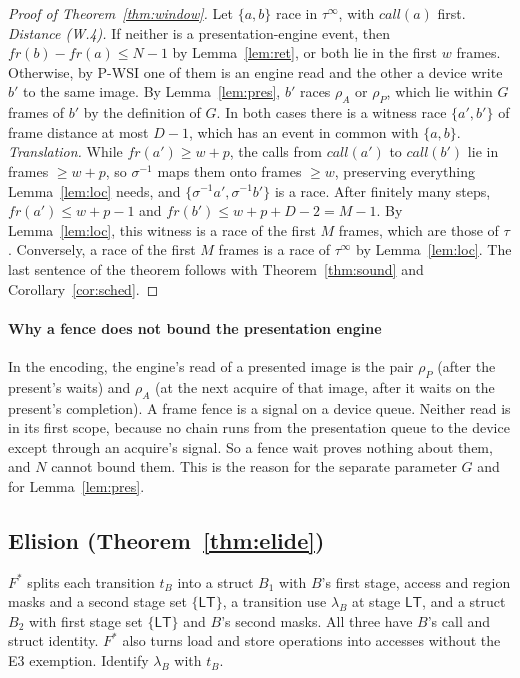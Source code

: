 \begin{proof}[Proof of Theorem~\ref{thm:window}]
Let $\{a,b\}$ race in $\tau^\infty$, with $\mathit{call}(a)$ first. \emph{Distance (W.4).} If neither is a
presentation-engine event, then $\mathit{fr}(b) - \mathit{fr}(a) \le N - 1$ by Lemma~\ref{lem:ret}, or both lie in
the first $w$ frames. Otherwise, by P-WSI one of them is an engine read and the other a device write $b'$ to the same
image. By Lemma~\ref{lem:pres}, $b'$ races $\rho_A$ or $\rho_P$, which lie within $G$ frames of $b'$ by the definition
of $G$. In both cases there is a witness race $\{a',b'\}$ of frame distance at most $D - 1$, which has an event in
common with $\{a,b\}$. \emph{Translation.} While $\mathit{fr}(a') \ge w + p$, the calls from $\mathit{call}(a')$ to
$\mathit{call}(b')$ lie in frames $\ge w + p$, so $\sigma^{-1}$ maps them onto frames $\ge w$, preserving everything
Lemma~\ref{lem:loc} needs, and $\{\sigma^{-1}a', \sigma^{-1}b'\}$ is a race. After finitely many steps, $\mathit{fr}(a')
\le w + p - 1$ and $\mathit{fr}(b') \le w + p + D - 2 = M - 1$. By Lemma~\ref{lem:loc}, this witness is a race of the
first $M$ frames, which are those of $\tau$. Conversely, a race of the first $M$ frames is a race of $\tau^\infty$ by
Lemma~\ref{lem:loc}. The last sentence of the theorem follows with Theorem~\ref{thm:sound} and
Corollary~\ref{cor:sched}.
\end{proof}

\paragraph{Why a fence does not bound the presentation engine}
In the encoding, the engine's read of a presented image is the pair $\rho_P$ (after the present's waits) and $\rho_A$
(at the next acquire of that image, after it waits on the present's completion). A frame fence is a signal on a device
queue. Neither read is in its first scope, because no chain runs from the presentation queue to the device except
through an acquire's signal. So a fence wait proves nothing about them, and $N$ cannot bound them. This is the
reason for the separate parameter $G$ and for Lemma~\ref{lem:pres}.

\subsection{Elision (Theorem~\ref{thm:elide})}
\label{app:elide}

$F^*$ splits each transition $t_B$ into a struct $B_1$ with $B$'s first stage, access and region masks and a second
stage set $\{\mathsf{LT}\}$, a transition use $\lambda_B$ at stage $\mathsf{LT}$, and a struct $B_2$ with first stage
set $\{\mathsf{LT}\}$ and $B$'s second masks. All three have $B$'s call and struct identity. $F^*$ also turns load and
store operations into accesses without the E3 exemption. Identify $\lambda_B$ with $t_B$.

